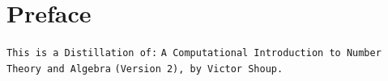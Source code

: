 \chapter*{Preface}

\begin{center}
    \vfill
    \verb|This is a Distillation of:|
    \verb |A Computational Introduction to Number Theory and Algebra|
    \verb|(Version 2), by Victor Shoup.|
    \vfill
\end{center}
